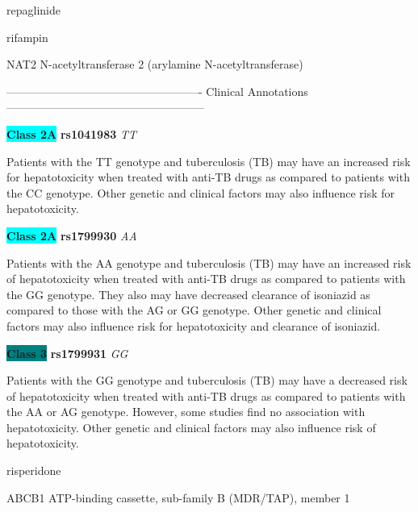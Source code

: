 \documentclass{resume} %
\begin{document}
\begin{rSection}{ repaglinide }
\end{rSection}\begin{rSection}{ rifampin }
\item[]

\begin{rSubsection}{ NAT2 }{ N-acetyltransferase 2 (arylamine N-acetyltransferase) }{}{}
\item[]

\item[] ---------------------------------------------------- Clinical Annotations -----------------------------------------------------\newline
\item \textbf{\colorbox{cyan} {Class 2A}} \textbf{ rs1041983 } \textit{ TT }
\item[] Patients with the TT genotype and tuberculosis (TB) may have an increased risk for hepatotoxicity when treated with anti-TB drugs as compared to patients with the CC genotype. Other genetic and clinical factors may also influence risk for hepatotoxicity.\item \textbf{\colorbox{cyan} {Class 2A}} \textbf{ rs1799930 } \textit{ AA }
\item[] Patients with the AA genotype and tuberculosis (TB) may have an increased risk of hepatotoxicity when treated with anti-TB drugs as compared to patients with the GG genotype. They also may have decreased clearance of isoniazid as compared to those with the AG or GG genotype. Other genetic and clinical factors may also influence risk for hepatotoxicity and clearance of isoniazid.\item \textbf{\colorbox{teal} {Class 3}} \textbf{ rs1799931 } \textit{ GG }
\item[] Patients with the GG genotype and tuberculosis (TB) may have a decreased risk of hepatotoxicity when treated with anti-TB drugs as compared to patients with the AA or AG genotype. However, some studies find no association with hepatotoxicity. Other genetic and clinical factors may also influence risk of hepatotoxicity.
\end{rSubsection}

\end{rSection}\begin{rSection}{ risperidone }
\item[]

\begin{rSubsection}{ ABCB1 }{ ATP-binding cassette, sub-family B (MDR/TAP), member 1 }{}{}
\item[]


\end{rSubsection}
\end{rSection}
\end{document}
